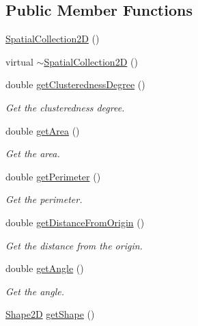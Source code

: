 \subsection*{Public Member Functions}
\begin{DoxyCompactItemize}
\item 
\hyperlink{classmultiscale_1_1analysis_1_1SpatialCollection2D_a3fa52a3930e498d763930a0c6a23a03c}{Spatial\-Collection2\-D} ()
\item 
virtual \hyperlink{classmultiscale_1_1analysis_1_1SpatialCollection2D_af70ae8f44636e7b2cf85705cffe44dfe}{$\sim$\-Spatial\-Collection2\-D} ()
\item 
double \hyperlink{classmultiscale_1_1analysis_1_1SpatialCollection2D_a85ae2bf2457ca5dfc14a43dc492a2dda}{get\-Clusteredness\-Degree} ()
\begin{DoxyCompactList}\small\item\em Get the clusteredness degree. \end{DoxyCompactList}\item 
double \hyperlink{classmultiscale_1_1analysis_1_1SpatialCollection2D_a192a2f1ee9e3af90a40c8c7c47618965}{get\-Area} ()
\begin{DoxyCompactList}\small\item\em Get the area. \end{DoxyCompactList}\item 
double \hyperlink{classmultiscale_1_1analysis_1_1SpatialCollection2D_a736028971bede12a98dbb72d5b0f1354}{get\-Perimeter} ()
\begin{DoxyCompactList}\small\item\em Get the perimeter. \end{DoxyCompactList}\item 
double \hyperlink{classmultiscale_1_1analysis_1_1SpatialCollection2D_aeef9f086af281569cf8f83dc2e1a0014}{get\-Distance\-From\-Origin} ()
\begin{DoxyCompactList}\small\item\em Get the distance from the origin. \end{DoxyCompactList}\item 
double \hyperlink{classmultiscale_1_1analysis_1_1SpatialCollection2D_a6bac1eb1ff6d06cdb0fd8036849b4f50}{get\-Angle} ()
\begin{DoxyCompactList}\small\item\em Get the angle. \end{DoxyCompactList}\item 
\hyperlink{namespacemultiscale_1_1analysis_ad1ef6155ab2e954c1c33d3e2e6b53fbf}{Shape2\-D} \hyperlink{classmultiscale_1_1analysis_1_1SpatialCollection2D_a7144355774b561b660adfca759316037}{get\-Shape} ()

\end{DoxyCompactItemize}
